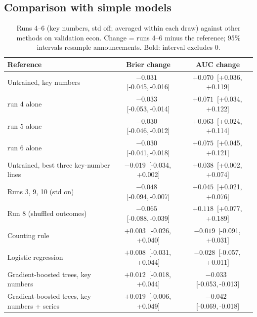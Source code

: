 \documentclass[11pt]{article}
\newcommand{\ci}[2]{\,[#1,\,#2]}
\begin{document}
\subsection{Comparison with simple models}
\label{sec:simple}

\begin{table}[t]
\centering\small
\caption{Runs 4--6 (key numbers, std off; averaged within each draw) against other methods on validation econ. Change = runs 4--6 minus the reference; 95\% intervals resample announcements. Bold: interval excludes 0.}
\label{tab:boot}
\begin{tabular}{lcc}
\toprule
Reference & Brier change & AUC change \\
\midrule
Untrained, key numbers & $\mathbf{-0.031}$ \ci{-0.045}{-0.016} & $\mathbf{+0.070}$ \ci{+0.036}{+0.119} \\
\quad run 4 alone & $\mathbf{-0.033}$ \ci{-0.053}{-0.014} & $\mathbf{+0.071}$ \ci{+0.034}{+0.122} \\
\quad run 5 alone & $\mathbf{-0.030}$ \ci{-0.046}{-0.012} & $\mathbf{+0.063}$ \ci{+0.024}{+0.114} \\
\quad run 6 alone & $\mathbf{-0.030}$ \ci{-0.041}{-0.018} & $\mathbf{+0.075}$ \ci{+0.045}{+0.121} \\
Untrained, best three key-number lines & $-0.019$ \ci{-0.034}{+0.002} & $\mathbf{+0.038}$ \ci{+0.002}{+0.074} \\
Runs 3, 9, 10 (std on) & $\mathbf{-0.048}$ \ci{-0.094}{-0.007} & $\mathbf{+0.045}$ \ci{+0.021}{+0.076} \\
Run 8 (shuffled outcomes) & $\mathbf{-0.065}$ \ci{-0.088}{-0.039} & $\mathbf{+0.118}$ \ci{+0.077}{+0.189} \\
Counting rule & $+0.003$ \ci{-0.026}{+0.040} & $-0.019$ \ci{-0.091}{+0.031} \\
Logistic regression & $+0.008$ \ci{-0.031}{+0.044} & $-0.028$ \ci{-0.057}{+0.011} \\
Gradient-boosted trees, key numbers & $+0.012$ \ci{-0.018}{+0.044} & $\mathbf{-0.033}$ \ci{-0.053}{-0.013} \\
Gradient-boosted trees, key numbers + series & $+0.019$ \ci{-0.006}{+0.049} & $\mathbf{-0.042}$ \ci{-0.069}{-0.018} \\
\bottomrule
\end{tabular}
\end{table}
\end{document}
